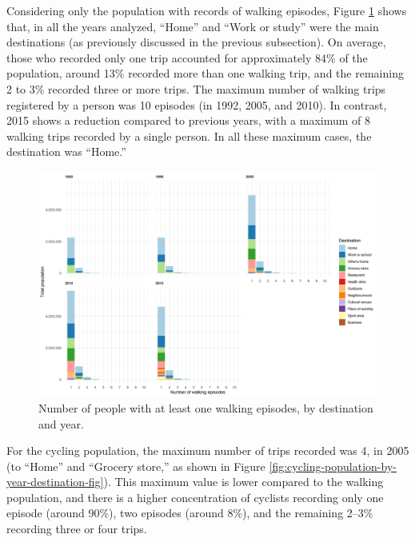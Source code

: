 \documentclass[preprint, 3p,
authoryear]{elsarticle} %
\begin{document}
Considering only the population with records of walking episodes, Figure
\ref{fig:walking-population-by-year-destination-fig} shows that, in all
the years analyzed, ``Home'' and ``Work or study'' were the main
destinations (as previously discussed in the previous subsection). On
average, those who recorded only one trip accounted for approximately
84\% of the population, around 13\% recorded more than one walking trip,
and the remaining 2 to 3\% recorded three or more trips. The maximum
number of walking trips registered by a person was 10 episodes (in 1992,
2005, and 2010). In contrast, 2015 shows a reduction compared to
previous years, with a maximum of 8 walking trips recorded by a single
person. In all these maximum cases, the destination was ``Home.''

\begin{figure}

{\centering \includegraphics[width=1\linewidth]{figures/people_per_ep_walking} 

}

\caption{Number of people with at least one walking episodes, by destination and year.}\label{fig:walking-population-by-year-destination-fig}
\end{figure}

For the cycling population, the maximum number of trips recorded was 4,
in 2005 (to ``Home'' and ``Grocery store,'' as shown in Figure
\ref{fig:cycling-population-by-year-destination-fig}). This maximum
value is lower compared to the walking population, and there is a higher
concentration of cyclists recording only one episode (around 90\%), two
episodes (around 8\%), and the remaining 2--3\% recording three or four
trips.
\end{document}

